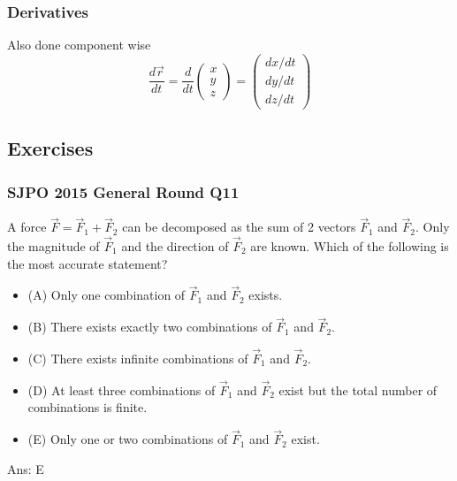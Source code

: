 \documentclass{article}
\begin{document}
\subsubsection{Derivatives}
Also done component wise
$$\frac{d\vec{r}}{dt} = \frac{d}{dt}\left(
    \begin{array}{c}  
         x \\
         y \\
         z
    \end{array} 
    \right) = \left(
    \begin{array}{c}  
         dx/dt \\
         dy/dt \\
         dz/dt
    \end{array} 
    \right)
$$

\subsection{Exercises}
\begin{samepage}
\subsubsection{SJPO 2015 General Round Q11}
A force $\vec{F} = \vec{F}_1 + \vec{F}_2$ can be decomposed as the sum of 2 vectors $\vec{F}_1$ and $\vec{F}_2$. Only the magnitude of $\vec{F}_1$ and the direction of $\vec{F}_2$ are known. Which of the following is the most accurate statement?
\begin{itemize}
\item[](A) Only one combination of $\vec{F}_1$ and $\vec{F}_2$ exists.
\item[](B) There exists exactly two combinations of $\vec{F}_1$ and $\vec{F}_2$.
\item[](C) There exists infinite combinations of $\vec{F}_1$ and $\vec{F}_2$.
\item[](D) At least three combinations of $\vec{F}_1$ and $\vec{F}_2$ exist but the total number of combinations is finite.
\item[](E) Only one or two combinations of $\vec{F}_1$ and $\vec{F}_2$ exist.
\end{itemize}
Ans: E
\end{samepage}
\end{document}
